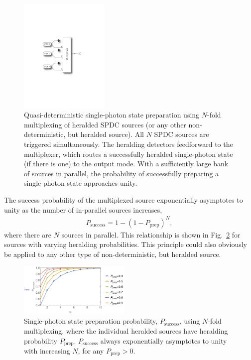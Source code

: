 \begin{figure}[!htbp]
\includegraphics[width=0.38\textwidth]{SPDC_multiplexing_arch}
\caption{Quasi-deterministic single-photon state preparation using $N$-fold multiplexing of heralded SPDC sources (or any other non-deterministic, but heralded source). All $N$ SPDC sources are triggered simultaneously. The heralding detectors feedforward to the multiplexer, which routes a successfully heralded single-photon state (if there is one) to the output mode. With a sufficiently large bank of sources in parallel, the probability of successfully preparing a single-photon state approaches unity.} \label{fig:SPDC_multiplexing_arch}
\end{figure}

The success probability of the multiplexed source exponentially asymptotes to unity as the number of in-parallel sources increases,
\begin{align} \label{eq:SPDC_multiplex}
P_\mathrm{success} = 1 - (1-P_\mathrm{prep})^N,
\end{align}
where there are $N$ sources in parallel. This relationship is shown in Fig.~\ref{fig:SPDC_multiplexing_plot} for sources with varying heralding probabilities. This principle could also obviously be applied to any other type of non-deterministic, but heralded source.

\begin{figure}[!htbp]
\includegraphics[width=0.475\textwidth]{SPDC_multiplexing_plot}
\caption{Single-photon state preparation probability, $P_\mathrm{success}$, using $N$-fold multiplexing, where the individual heralded sources have heralding probability $P_\mathrm{prep}$. $P_\mathrm{success}$ always exponentially asymptotes to unity with increasing $N$, for any \mbox{$P_\mathrm{prep}>0$}.} \label{fig:SPDC_multiplexing_plot}
\end{figure}

